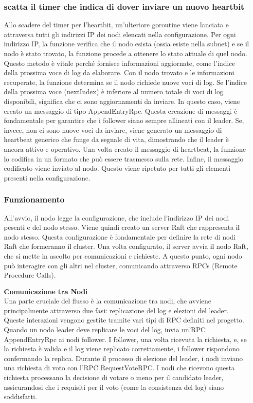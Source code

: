 \subsubsection{scatta il timer che indica di dover inviare un nuovo heartbit}
Allo scadere del timer per l'heartbit, un'ulteriore goroutine viene lanciata e attraversa tutti gli indirizzi IP dei nodi elencati nella configurazione. Per ogni indirizzo IP, la funzione verifica che il nodo esista (ossia esiste 
nella subnet) e
se il nodo è stato trovato, la funzione procede a ottenere lo stato attuale di quel nodo. Questo metodo è vitale perché fornisce informazioni aggiornate, come l'indice della prossima voce di log da elaborare. 
Con il nodo trovato e le informazioni recuperate, la funzione determina se il nodo richiede nuove voci di log. Se l'indice della prossima voce (nextIndex) è inferiore al numero totale di voci di log disponibili, significa che ci
sono aggiornamenti da inviare. In questo caso, viene creato un messaggio di tipo AppendEntryRpc.
Questa creazione di messaggi è fondamentale per garantire che i follower siano sempre allineati con il leader. Se, invece, non ci sono nuove voci da inviare, viene generato un messaggio di heartbeat generico che funge da 
segnale di vita, dimostrando che il leader è ancora attivo e operativo.
Una volta creato il messaggio di heartbeat, la funzione lo codifica in un formato che può essere trasmesso sulla rete.
Infine, il messaggio codificato viene inviato al nodo. 
Questo viene ripetuto per tutti gli elementi presenti nella configurazione.

\subsubsection{Funzionamento}
All'avvio, il nodo legge la configurazione, che include l'indirizzo IP dei nodi pesenti e del nodo stesso. Viene quindi creato un server Raft che rappresenta il nodo stesso. Questa configurazione è fondamentale per definire la 
rete di nodi Raft che formeranno il cluster.
Una volta configurato, il server avvia il nodo Raft, che si mette in ascolto per comunicazioni e richieste. A questo punto, ogni nodo può interagire con gli altri nel cluster, comunicando attraverso RPCs (Remote Procedure Calls).

\textbf{Comunicazione tra Nodi}\\
Una parte cruciale del flusso è la comunicazione tra nodi, che avviene principalmente attraverso due fasi: replicazione del log e elezioni del leader. Queste interazioni vengono gestite tramite vari tipi di RPC definiti 
nel progetto.
Quando un nodo leader deve replicare le voci del log, invia un'RPC AppendEntryRpc ai nodi follower. I follower, una volta ricevuta la richiesta, e, se la richiesta è valida e il log viene replicato correttamente, i follower 
rispondono confermando la replica.
Durante il processo di elezione del leader, i nodi inviano una richiesta di voto con l'RPC RequestVoteRPC. I nodi che ricevono questa richiesta processano la decisione di votare o meno per il candidato leader, assicurandosi 
che i requisiti per il voto (come la consistenza del log) siano soddisfatti.

